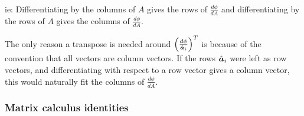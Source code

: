 \documentclass[../../main.tex]{subfiles}
\begin{document}
ie: Differentiating by the columns of $A$ gives the rows of $\frac{d\phi}{dA}$ and differentiating by the rows of $A$ gives the columns of $\frac{d\phi}{dA}$.

The only reason a transpose is needed around ${\left(\frac{d\phi}{\hat{\bm{a}}_i}\right)}^T$ is because of the convention that all vectors are column vectors. If the rows $\hat{\bm{a}}_i$ were left as row vectors, and differentiating with respect to a row vector gives a column vector, this would naturally fit the columns of $\frac{d\phi}{dA}$.

\subsubsection{Matrix calculus identities}
\end{document}
